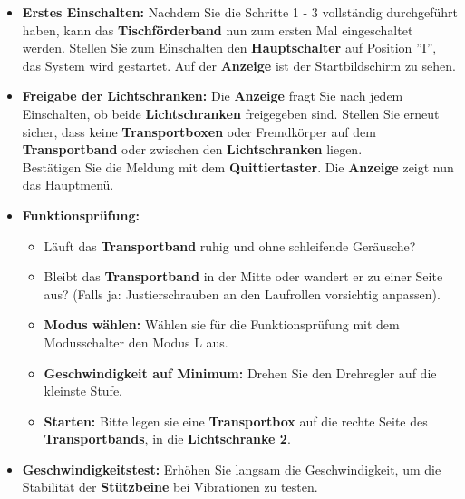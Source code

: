 \begin{itemize}
	\item \textbf{Erstes Einschalten: } Nachdem Sie die Schritte 1 - 3 vollständig durchgeführt haben, kann das \textbf{Tischförderband} nun zum ersten Mal eingeschaltet werden.
	Stellen Sie zum Einschalten den \textbf{Hauptschalter} auf Position ''I'', das System wird gestartet.
	Auf der \textbf{Anzeige} ist der Startbildschirm zu sehen.
	
	\item \textbf{Freigabe der Lichtschranken:} Die \textbf{Anzeige} fragt Sie nach jedem Einschalten, ob beide \textbf{Lichtschranken} freigegeben sind. Stellen Sie erneut sicher, dass keine \textbf{Transportboxen} oder Fremdkörper auf dem \textbf{Transportband} oder zwischen den \textbf{Lichtschranken} liegen.\\
	Bestätigen Sie die Meldung mit dem \textbf{Quittiertaster}. Die \textbf{Anzeige} zeigt nun das Hauptmenü.
	
	\item \textbf{Funktionsprüfung:}
	
	
	\begin{itemize}
		\item Läuft das \textbf{Transportband} ruhig und ohne schleifende Geräusche?
		
		\item Bleibt das \textbf{Transportband} in der Mitte oder wandert er zu einer Seite aus? (Falls ja: Justierschrauben an den Laufrollen vorsichtig anpassen).	
		
		\item \textbf{Modus wählen:} Wählen sie für die Funktionsprüfung mit dem Modusschalter den Modus L aus.  
		
		\item \textbf{Geschwindigkeit auf Minimum:} Drehen Sie den Drehregler auf die kleinste Stufe.
		
		\item \textbf{Starten:} Bitte legen sie eine \textbf{Transportbox} auf die rechte Seite des \textbf{Transportbands}, in die \textbf{Lichtschranke 2}. 
		
	\end{itemize}
	
	\item \textbf{Geschwindigkeitstest:} Erhöhen Sie langsam die Geschwindigkeit, um die Stabilität der \textbf{Stützbeine} bei Vibrationen zu testen.
\end{itemize}



